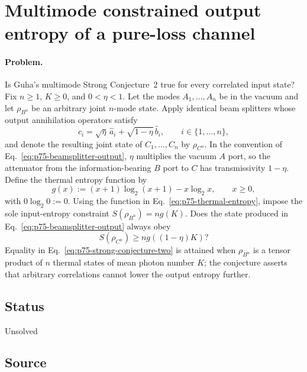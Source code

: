 \section{Multimode constrained output entropy of a pure-loss channel}
\label{sec:problem-75}

\paragraph{Problem.}
Is Guha's multimode Strong Conjecture~2 true for every correlated input state?
Fix $n\geq1$, $K\geq0$, and $0<\eta<1$.  Let the modes
$A_1,\ldots,A_n$ be in the vacuum and let $\rho_{B^n}$ be an arbitrary joint
$n$-mode state.  Apply identical beam splitters whose output annihilation
operators satisfy
\begin{equation}
  \hat c_i=\sqrt{\eta}\,\hat a_i
    +\sqrt{1-\eta}\,\hat b_i,
  \qquad i\in\{1,\ldots,n\},
  \label{eq:p75-beamsplitter-output}
\end{equation}
and denote the resulting joint state of $C_1,\ldots,C_n$ by
$\rho_{C^n}$.  In the convention of Eq.~\eqref{eq:p75-beamsplitter-output},
$\eta$ multiplies the vacuum $A$ port, so the attenuator from the
information-bearing $B$ port to $C$ has transmissivity $1-\eta$.  Define the
thermal entropy function by
\begin{equation}
  g(x):=(x+1)\log_2(x+1)-x\log_2x,
  \qquad x\geq0,
  \label{eq:p75-thermal-entropy}
\end{equation}
with $0\log_2 0:=0$.  Using the function in
Eq.~\eqref{eq:p75-thermal-entropy}, impose the sole
input-entropy constraint $S(\rho_{B^n})=ng(K)$.  Does the state produced in
Eq.~\eqref{eq:p75-beamsplitter-output} always obey
\begin{equation}
  S(\rho_{C^n})\geq ng((1-\eta)K)?
  \label{eq:p75-strong-conjecture-two}
\end{equation}
Equality in Eq.~\eqref{eq:p75-strong-conjecture-two} is attained when
$\rho_{B^n}$ is a tensor product of $n$ thermal states of mean photon number
$K$; the conjecture asserts that arbitrary correlations cannot lower the
output entropy further.

\subsection*{Status}

Unsolved

\subsection*{Source}

